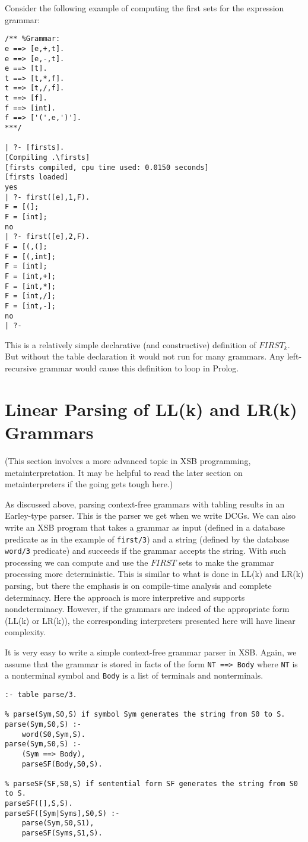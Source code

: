 Consider the following example of computing the first sets for the
expression grammar:
\begin{verbatim}
/** %Grammar:
e ==> [e,+,t].
e ==> [e,-,t].
e ==> [t].
t ==> [t,*,f].
t ==> [t,/,f].
t ==> [f].
f ==> [int].
f ==> ['(',e,')'].
***/

| ?- [firsts].
[Compiling .\firsts]
[firsts compiled, cpu time used: 0.0150 seconds]
[firsts loaded]
yes
| ?- first([e],1,F).
F = [(];
F = [int];
no
| ?- first([e],2,F).
F = [(,(];
F = [(,int];
F = [int];
F = [int,+];
F = [int,*];
F = [int,/];
F = [int,-];
no
| ?- 
\end{verbatim}

This is a relatively simple declarative (and constructive) definition
of $FIRST_k$.  But without the table declaration it would not run for
many grammars.  Any left-recursive grammar would cause this definition
to loop in Prolog.

\section{Linear Parsing of LL(k) and LR(k) Grammars}

(This section involves a more advanced topic in XSB programming,
metainterpretation.  It may be helpful to read the later section on
metainterpreters if the going gets tough here.)

As discussed above, parsing context-free grammars with tabling results
in an Earley-type parser. This is the parser we get when we write
DCGs.  We can also write an XSB program that takes a grammar as input
(defined in a database predicate as in the example of \verb|first/3|)
and a string (defined by the database \verb|word/3| predicate) and
succeeds if the grammar accepts the string.  With such processing we
can compute and use the $FIRST$ sets to make the grammar processing
more deterministic.  This is similar to what is done in LL(k) and
LR(k) parsing, but there the emphasis is on compile-time analysis and
complete determinacy.  Here the approach is more interpretive and
supports nondeterminacy.  However, if the grammars are indeed of the
appropriate form (LL(k) or LR(k)), the corresponding interpreters
presented here will have linear complexity.

It is very easy to write a simple context-free grammar parser in XSB.
Again, we assume that the grammar is stored in facts of the form 
\verb|NT ==> Body| where \verb|NT| is a nonterminal symbol and
\verb|Body| is a list of terminals and nonterminals.
\begin{verbatim}
:- table parse/3.

% parse(Sym,S0,S) if symbol Sym generates the string from S0 to S.
parse(Sym,S0,S) :-
    word(S0,Sym,S).
parse(Sym,S0,S) :-
    (Sym ==> Body),
    parseSF(Body,S0,S).

% parseSF(SF,S0,S) if sentential form SF generates the string from S0 to S.
parseSF([],S,S).
parseSF([Sym|Syms],S0,S) :-
    parse(Sym,S0,S1),
    parseSF(Syms,S1,S).
\end{verbatim}


